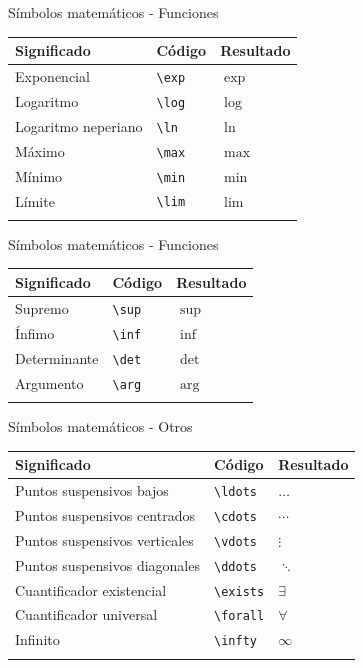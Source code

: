 \documentclass[
  ignorenonframetext,
]{beamer}
\begin{document}
\begin{frame}[fragile]{Símbolos matemáticos - Funciones}
\label{suxedmbolos-matemuxe1ticos---funciones-1}
\begin{longtable}[]{@{}lll@{}}
\toprule\noalign{}
Significado & Código & Resultado \\
\midrule\noalign{}
\endhead
Exponencial & \texttt{\textbackslash{}exp} & \(\exp\) \\
Logaritmo & \texttt{\textbackslash{}log} & \(\log\) \\
Logaritmo neperiano & \texttt{\textbackslash{}ln} & \(\ln\) \\
Máximo & \texttt{\textbackslash{}max} & \(\max\) \\
Mínimo & \texttt{\textbackslash{}min} & \(\min\) \\
Límite & \texttt{\textbackslash{}lim} & \(\lim\) \\
\bottomrule\noalign{}
\end{longtable}
\end{frame}

\begin{frame}[fragile]{Símbolos matemáticos - Funciones}
\label{suxedmbolos-matemuxe1ticos---funciones-2}
\begin{longtable}[]{@{}lll@{}}
\toprule\noalign{}
Significado & Código & Resultado \\
\midrule\noalign{}
\endhead
Supremo & \texttt{\textbackslash{}sup} & \(\sup\) \\
Ínfimo & \texttt{\textbackslash{}inf} & \(\inf\) \\
Determinante & \texttt{\textbackslash{}det} & \(\det\) \\
Argumento & \texttt{\textbackslash{}arg} & \(\arg\) \\
\bottomrule\noalign{}
\end{longtable}
\end{frame}

\begin{frame}[fragile]{Símbolos matemáticos - Otros}
\label{suxedmbolos-matemuxe1ticos---otros}
\begin{longtable}[]{@{}lll@{}}
\toprule\noalign{}
Significado & Código & Resultado \\
\midrule\noalign{}
\endhead
Puntos suspensivos bajos & \texttt{\textbackslash{}ldots} &
\(\ldots\) \\
Puntos suspensivos centrados & \texttt{\textbackslash{}cdots} &
\(\cdots\) \\
Puntos suspensivos verticales & \texttt{\textbackslash{}vdots} &
\(\vdots\) \\
Puntos suspensivos diagonales & \texttt{\textbackslash{}ddots} &
\(\ddots\) \\
Cuantificador existencial & \texttt{\textbackslash{}exists} &
\(\exists\) \\
Cuantificador universal & \texttt{\textbackslash{}forall} &
\(\forall\) \\
Infinito & \texttt{\textbackslash{}infty} & \(\infty\) \\
\bottomrule\noalign{}
\end{longtable}
\end{frame}
\end{document}
